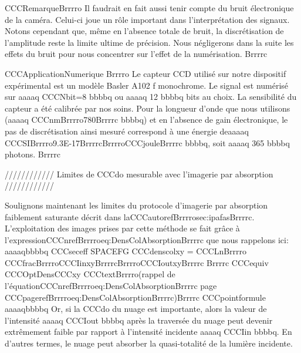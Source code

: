 CCCRemarqueBrrrro
Il faudrait en fait aussi tenir compte du bruit électronique de la caméra. Celui-ci joue un rôle important dans l'interprétation des signaux. Notons cependant que, même en l'absence totale de bruit, la discrétisation de l'amplitude reste la limite ultime de précision. Nous négligerons dans la suite les effets du bruit pour nous concentrer sur l'effet de la numérisation.
Brrrrc


CCCApplicationNumerique
Brrrro
Le capteur CCD utilisé sur notre dispositif expérimental est un modèle Basler A102 f monochrome. 
Le signal est numérisé sur aaaaq CCCNbit=8 bbbbq ou aaaaq 12 bbbbq bits au choix. La sensibilité du capteur a été calibrée par nos soins. 
 Pour la longueur d'onde que nous utilisons (aaaaq CCCnmBrrrro780Brrrrc bbbbq) et en l'absence de gain électronique, le pas de discrétisation ainsi mesuré correspond à une énergie deaaaaq CCCSIBrrrro9.3E-17BrrrrcBrrrroCCCjouleBrrrrc bbbbq, soit aaaaq 365 bbbbq photons.
Brrrrc

//////////// Limites de CCCdo mesurable avec l'imagerie par absorption ////////////


Soulignons maintenant les limites du protocole d'imagerie par absorption faiblement saturante décrit dans laCCCautorefBrrrrosec:ipafasBrrrrc. 
L'exploitation des images prises par cette méthode se fait grâce à l'expressionCCCnrefBrrrroeq:DensColAbsorptionBrrrrc que nous rappelons ici:
aaaaqbbbbq
	CCCseceff  SPACEFG  CCCdenscolxy 
	= 
	CCCLnBrrrro
	CCCfracBrrrroCCCIinxyBrrrrcBrrrroCCCIoutxyBrrrrc
	Brrrrc
	CCCequiv CCCOptDensCCCxy
	CCCtextBrrrro(rappel de l'équationCCCnrefBrrrroeq:DensColAbsorptionBrrrrc page  CCCpagerefBrrrroeq:DensColAbsorptionBrrrrc)Brrrrc
CCCpointformule
aaaaqbbbbq
Or, si la CCCdo du nuage est importante, alors la valeur de l'intensité aaaaq CCCIout bbbbq après la traversée du nuage peut devenir extrêmement faible
 par rapport à l'intensité incidente aaaaq CCCIin bbbbq. En d'autres termes, le nuage peut absorber la quasi-totalité de la lumière incidente.

